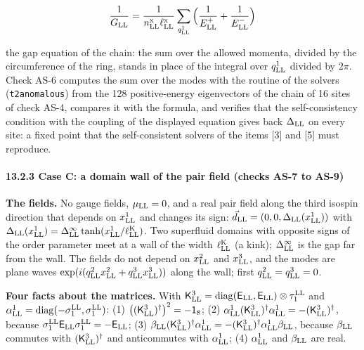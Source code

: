 \documentclass[
  10pt,
]{article}
\begin{document}
\[\frac1{G_{\rm LL}}=\frac1{n^{\rm x}_{\rm LL}\ell^{\rm x}_{\rm LL}}\sum_{q^1_{\rm LL}}\Big(\frac1{E^+_{\rm LL}}+\frac1{E^-_{\rm LL}}\Big)\]

the gap equation of the chain: the sum over the allowed momenta, divided
by the circumference of the ring, stands in place of the integral over
\(q^1_{\rm LL}\) divided by \(2\pi\). Check AS-6 computes the sum over
the modes with the routine of the solvers (\texttt{t2anomalous}) from
the 128 positive-energy eigenvectors of the chain of 16 sites of check
AS-4, compares it with the formula, and verifies that the
self-consistency condition with the coupling of the displayed equation
gives back \(\Delta_{\rm LL}\) on every site: a fixed point that the
self-consistent solvers of the items {[}3{]} and {[}5{]} must reproduce.

\hypertarget{case-c-a-domain-wall-of-the-pair-field-checks-as-7-to-as-9}{%
\paragraph{13.2.3 Case C: a domain wall of the pair field (checks AS-7
to
AS-9)}\label{case-c-a-domain-wall-of-the-pair-field-checks-as-7-to-as-9}}

\textbf{The fields.} No gauge fields, \(\mu_{\rm LL}=0\), and a real
pair field along the third isospin direction that depends on
\(x^1_{\rm LL}\) and changes its sign:
\(\vec d_{\rm LL}=(0,0,\Delta_{\rm LL}(x^1_{\rm LL}))\) with
\(\Delta_{\rm LL}(x^1_{\rm LL})=\Delta^\infty_{\rm LL}\tanh(x^1_{\rm LL}/\ell^{\rm K}_{\rm LL})\).
Two superfluid domains with opposite signs of the order parameter meet
at a wall of the width \(\ell^{\rm K}_{\rm LL}\) (a kink);
\(\Delta^\infty_{\rm LL}\) is the gap far from the wall. The fields do
not depend on \(x^2_{\rm LL}\) and \(x^3_{\rm LL}\), and the modes are
plane waves
\(\exp(i(q^2_{\rm LL}x^2_{\rm LL}+q^3_{\rm LL}x^3_{\rm LL}))\) along the
wall; first \(q^2_{\rm LL}=q^3_{\rm LL}=0\).

\textbf{Four facts about the matrices.} With
\(\mathsf K^3_{\rm LL}=\mathrm{diag}(\mathsf E_{\rm LL},\mathsf E_{\rm LL})\otimes\tau^{\rm LL}_1\)
and
\(\alpha^1_{\rm LL}=\mathrm{diag}(-\sigma^{\rm LL}_1,\sigma^{\rm LL}_1)\):
(1) \(\big((\mathsf K^3_{\rm LL})^\dagger\big)^2=-\mathsf 1_8\); (2)
\(\alpha^1_{\rm LL}(\mathsf K^3_{\rm LL})^\dagger\alpha^1_{\rm LL}=-(\mathsf K^3_{\rm LL})^\dagger\),
because
\(\sigma^{\rm LL}_1\mathsf E_{\rm LL}\sigma^{\rm LL}_1=-\mathsf E_{\rm LL}\);
(3)
\(\beta_{\rm LL}(\mathsf K^3_{\rm LL})^\dagger\alpha^1_{\rm LL}=-(\mathsf K^3_{\rm LL})^\dagger\alpha^1_{\rm LL}\beta_{\rm LL}\),
because \(\beta_{\rm LL}\) commutes with
\((\mathsf K^3_{\rm LL})^\dagger\) and anticommutes with
\(\alpha^1_{\rm LL}\); (4) \(\alpha^1_{\rm LL}\) and \(\beta_{\rm LL}\)
are real.
\end{document}
